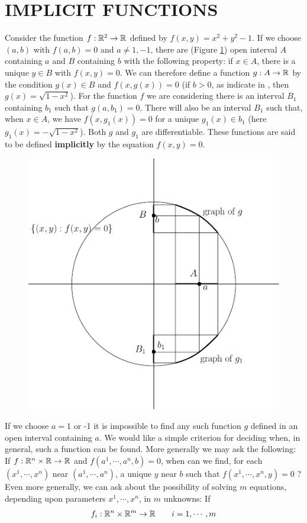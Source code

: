 \section{IMPLICIT FUNCTIONS}
Consider the function $f:\mathbb{R}^2\to \mathbb{R}$ defined by $f(x, y) = x^2 + y^2 -1$. If 
we choose $(a, b)$ with $f(a, b) = 0$ and $a\neq 1, -1$, there are  (Figure \ref{Fig 2-4}) open 
interval $A$ containing $a$ and $B$ containing $b$ with the following property:
if $x\in A$, there is a unique $y\in B$ with $f(x, y) = 0$. We can therefore define 
a function $g:A\to \mathbb{R}$ by the condition $g(x)\in B$ and $f(x, g(x)) = 0$ (if $b>0$,
as indicate in , then $g(x) = \sqrt{1-x^2}$). For the function $f$ we are considering
there is an interval $B_1$ containing $b_1$ such that $g(a, b_1)=0$. There will also be 
an interval $B_1$ such that, when $x\in A$, we have $f(x, g_1(x)) = 0$ for a unique $g_1(x)\in b_1$ 
(here $g_1(x) = -\sqrt{1-x^2}$). Both $g$ and $g_1$ are differentiable. These functions are 
said to be defined \textbf{implicitly}%
 by the equation $f(x, y) = 0$.

\begin{figure}[!htb]
    \centering
    \includegraphics[width=.75\linewidth]{./pics/Fig2-4.pdf}
    \caption{}
    \label{Fig 2-4}
\end{figure}

If we choose $a = 1$ or -1 it is impossible to find any such
function $g$ defined in an open interval containing $a$.
We would like a simple criterion for deciding when, in general,
such a function can be found. More generally we may ask
the following: If $f:\mathbb{R}^n \times \mathbb{R}\to \mathbb{R}$ and 
$f(a^1,\cdots,a^n, b) = 0$, when can we find, for each 
$(x^1,\cdots ,x^n)$ near $(a^1,\cdots,a^n)$,
a unique $y$ near $b$ such that $f(x^1,\cdots,x^n,y) = 0$ ? Even
more generally, we can ask about the possibility of solving
$m$ equations, depending upon parameters $x^1,\cdots,x^n$, in $m$
unknowns: If
\begin{align*}
    f_i:\mathbb{R}^n\times \mathbb{R}^m \to \mathbb{R}\qquad i=1, \cdots, m
\end{align*}

